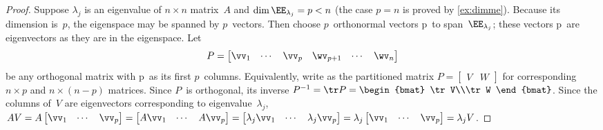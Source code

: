 \begin{comment}Reviewer comment:
It may be useful to point out that the computation actually establishes the fact that for any square matrix \(A\) and any same-size invertible matrix \(P\), the characteristic polynomials of \(A\) and \(P^{-1}AP\) are the same. (Change of basis formula, same underlying linear transformation, eigenvalues come from the lin. tranf. and not the matrix. But perhaps this is not the right place for this kind of explanation.)
\end{comment}
\begin{proof} 
Suppose \(\lambda_j\) is an eigenvalue of \(n\times n\) matrix~\(A\) and \(\dim\EE_{\lambda_j}=p<n\) (the case \(p=n\) is proved by \cref{ex:dimme}).
Because its dimension is~\(p\), the eigenspace may be spanned by \(p\)~vectors.
Then choose \(p\)~orthonormal vectors \hlist\vv p\ to span~\(\EE_{\lambda_j}\); these vectors \hlist\vv p\ are eigenvectors as they are in the eigenspace.
Let
\begin{equation*}
P=\begin{bmatrix} \vv_1&\cdots&\vv_p&\wv_{p+1}&\cdots&\wv_n \end{bmatrix}
\end{equation*}
be any orthogonal matrix with \hlist\vv p\ as its first \(p\)~columns.
Equivalently, write as the partitioned matrix \(P=\begin{bmatrix} V&W \end{bmatrix}\) for corresponding \(n\times p\) and \(n\times(n-p)\) matrices.
Since \(P\)~is orthogonal, its inverse \(P^{-1}=\tr P=\begin{bmat} \tr V\\\tr W \end{bmat}\).
Since the columns of~\(V\) are eigenvectors corresponding to eigenvalue~\(\lambda_j\), \(AV=A\begin{bmatrix} \vv_1&\cdots&\vv_p \end{bmatrix}
=\begin{bmatrix} A\vv_1&\cdots&A\vv_p \end{bmatrix}
=\begin{bmatrix} \lambda_j\vv_1&\cdots&\lambda_j\vv_p \end{bmatrix}
=\lambda_j\begin{bmatrix} \vv_1&\cdots&\vv_p \end{bmatrix}
=\lambda_jV\).


\end{proof}
